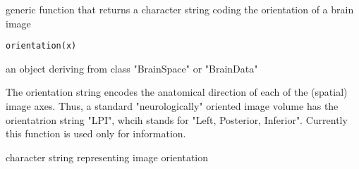 \begin{Description}\relax
generic function that returns a character string coding the
orientation of a brain image
\end{Description}
\begin{Usage}
\begin{verbatim}
orientation(x)
\end{verbatim}
\end{Usage}
\begin{Arguments}
\begin{ldescription}
\item[\code{x}] an object deriving from class "BrainSpace" or "BrainData" 
\end{ldescription}
\end{Arguments}
\begin{Details}\relax
The orientation string encodes the anatomical direction of each of the
(spatial) image axes.  Thus, a standard "neurologically" oriented
image volume has the orientatrion string "LPI", whcih stands for
"Left, Posterior, Inferior".  Currently this function is used only for
information.
\end{Details}
\begin{Value}
character string representing image orientation
\end{Value}

